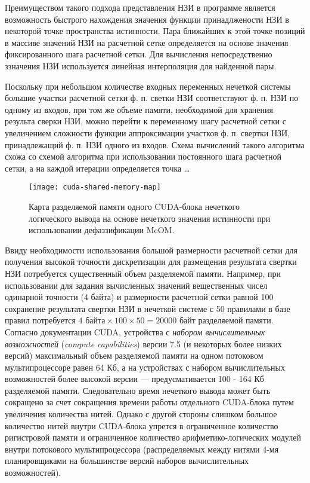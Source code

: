 Преимуществом такого подхода представления НЗИ в программе является возможность быстрого нахождения значения функции принадлжености НЗИ в некоторой точке пространства истинности. Пара ближайших к этой точке позиций в массиве значений НЗИ на расчетной сетке определяется на основе значения фиксированного шага расчетной сетки. Для вычисления непосредственно ззначения НЗИ используется линейная интерполяция для найденной пары.

Поскольку при небольшом количестве входных переменных нечеткой системы большие участки расчетной сетки ф. п. светки НЗИ соответствуют ф. п. НЗИ по одному из входов, при том же объеме памяти, необходимой для хранения результа сверки НЗИ, можно перейти к переменному шагу расчетной сетки с увеличением сложности функции аппроксимации участков ф. п. свертки НЗИ, принадлежащий ф. п. НЗИ одного из входов. Схема вычислений такого алгоритма схожа со схемой алгоритма при использовании постоянного шага расчетной сетки, а на каждой итерации определяется точка \dots

\begin{figure}[ht]
	\centering
	\texttt{[image: cuda-shared-memory-map]}
	\caption{Карта разделяемой памяти одного CUDA-блока нечеткого логического вывода на основе нечеткого значения истинности при использовании дефаззификации MeOM.}
	\label{fig:ftv-infer-cuda-shared-memory-map}
\end{figure}

Ввиду необходимости использования большой размерности расчетной сетки для получения высокой точности дискретизации для размещения результата свертки НЗИ потребуется существенный объем разделяемой памяти. Например, при использовании для задания вычисленных значений вещественных чисел одинарной точности (4 байта) и размерности расчетной сетки равной 100 сохранение результата свертки НЗИ в нечеткой системе с 50 правилами в базе правил потребуется $4\textrm{ байта}\times 100 \times 50 = 20000\textrm{ байт}$ разделяемой памяти. Согласно документации CUDA, устройства с \textit{набором вычислительных возможностей} (\textit{compute capabilities}) версии 7.5 (и некоторых более низких версий) максимальный объем разделяемой памяти на одном потоковом мультипроцессоре равен 64 Кб, а на устройствах с набором вычислительных возможностей более высокой версии --- предусмативается 100 - 164 Кб разделяемой памяти. Следовательно время нечеткого вывода может быть сокращено за счет сокращения времени работы отдельного CUDA-блока путем увеличения количества нитей. Однако с другой стороны слишком большое количество нитей внутри CUDA-блока упрется в ограниченное количество ригистровой памяти и ограниченное количество арифметико-логических модулей внутри потокового мультипроцессора (распределяемых между нитями 4-мя планировщиками на большинстве версий наборов вычислительных возможностей).

